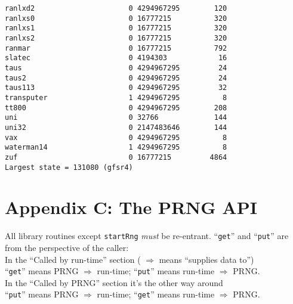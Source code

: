 \documentclass[letterpaper,12pt]{article}
\begin{document}
{\begin{verbatim}
ranlxd2                      0 4294967295        120
ranlxs0                      0 16777215          320
ranlxs1                      0 16777215          320
ranlxs2                      0 16777215          320
ranmar                       0 16777215          792
slatec                       0 4194303            16
taus                         0 4294967295         24
taus2                        0 4294967295         24
taus113                      0 4294967295         32
transputer                   1 4294967295          8
tt800                        0 4294967295        208
uni                          0 32766             144
uni32                        0 2147483646        144
vax                          0 4294967295          8
waterman14                   1 4294967295          8
zuf                          0 16777215         4864
Largest state = 131080 (gfsr4)
\end{verbatim}
}
\pagebreak
\section*{Appendix C: The PRNG API}
All library routines except \texttt{startRng} {\em must} be re-entrant.
``\texttt{get}'' and ``\texttt{put}'' are from the perspective of the
caller:\\
In the ``Called by run-time'' section  ( $\Rightarrow$ means ``supplies data to'')\\
\indent
``\texttt{get}'' means PRNG $\Rightarrow$ run-time;
``\texttt{put}'' means run-time $\Rightarrow$ PRNG.\\
In the ``Called by PRNG'' section it's the other way around\\
\indent
``\texttt{put}'' means PRNG $\Rightarrow$ run-time;
``\texttt{get}'' means run-time $\Rightarrow$ PRNG.\\\\
\end{document}
